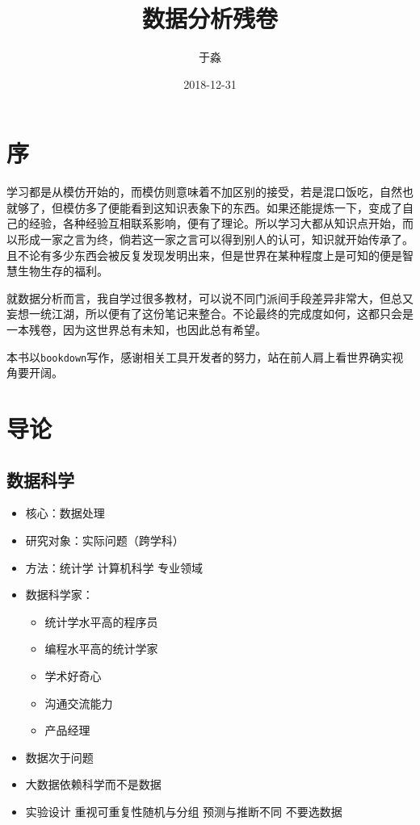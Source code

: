 \documentclass[]{book}
\title{数据分析残卷}
\author{于淼}
\date{2018-12-31}
\providecommand{\tightlist}{%
  \setlength{\itemsep}{0pt}\setlength{\parskip}{0pt}}
\begin{document}
\maketitle

{
\setcounter{tocdepth}{1}
\tableofcontents
}
\chapter*{序}

学习都是从模仿开始的，而模仿则意味着不加区别的接受，若是混口饭吃，自然也就够了，但模仿多了便能看到这知识表象下的东西。如果还能提炼一下，变成了自己的经验，各种经验互相联系影响，便有了理论。所以学习大都从知识点开始，而以形成一家之言为终，倘若这一家之言可以得到别人的认可，知识就开始传承了。且不论有多少东西会被反复发现发明出来，但是世界在某种程度上是可知的便是智慧生物生存的福利。

就数据分析而言，我自学过很多教材，可以说不同门派间手段差异非常大，但总又妄想一统江湖，所以便有了这份笔记来整合。不论最终的完成度如何，这都只会是一本残卷，因为这世界总有未知，也因此总有希望。

本书以\texttt{bookdown}写作，感谢相关工具开发者的努力，站在前人肩上看世界确实视角要开阔。

\chapter{导论}

\section{数据科学}

\begin{itemize}
\tightlist
\item
  核心：数据处理
\item
  研究对象：实际问题（跨学科）
\item
  方法：统计学 计算机科学 专业领域
\item
  数据科学家：

  \begin{itemize}
  \tightlist
  \item
    统计学水平高的程序员
  \item
    编程水平高的统计学家
  \item
    学术好奇心
  \item
    沟通交流能力
  \item
    产品经理
  \end{itemize}
\item
  数据次于问题
\item
  大数据依赖科学而不是数据
\item
  实验设计 重视可重复性随机与分组 预测与推断不同 不要选数据
\end{itemize}
\end{document}
